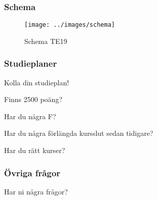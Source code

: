 \documentclass[11pt]{beamer}
\begin{document}
    \begin{frame}
        \frametitle{Schema}
        \begin{figure}[!h]
            \texttt{[image: ../images/schema]}
            \caption{Schema TE19}
        \end{figure}
    \end{frame}

    \begin{frame}
        \frametitle{Studieplaner}
        Kolla din studieplan!
        \begin{enumeration}
            \item Finns 2500 poäng?
            \item Har du några F?
            \item Har du några förlängda kursslut sedan tidigare?
            \item Har du rätt kurser?
        \end{enumeration}
    \end{frame}

    \begin{frame}
        \frametitle{Övriga frågor}
        Har ni några frågor?
    \end{frame}
\end{document}
